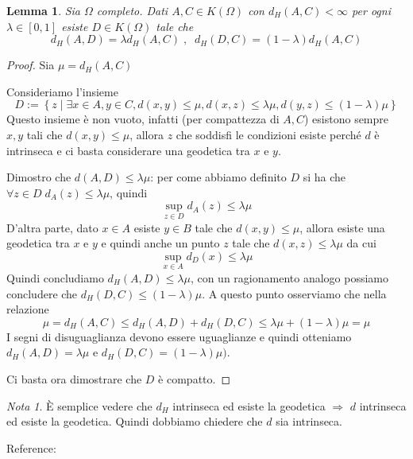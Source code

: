 \documentclass[a4paper,10pt]{article}
\newcounter{counter1}
\theoremstyle{plain}
\newtheorem{mylem}[counter1]{Lemma}
\theoremstyle{definition}
\theoremstyle{remark}
\newtheorem{mynot}[counter1]{Nota}
\newcommand{\set}[1]{\left\{#1\right\}}
\newcommand{\bra}[1]{\left[#1\right]}
\begin{document}
\begin{mylem}\cite[Proposizione 2.16]{DuciMennucci2007}
  Sia $\Omega$ completo. Dati $A,C \in K(\Omega)$ con $d_H(A,C) <
  \infty$ per ogni $\lambda \in \bra{0,1}$ esiste $D\in K(\Omega)$
  tale che
  \[ d_H(A,D) = \lambda d_H(A,C) \; , \;\;  d_H(D,C) = (1-\lambda)
  d_H(A,C) \] 
\end{mylem}
\begin{proof}
  Sia $\mu = d_H(A,C)$

  Consideriamo l'insieme
  \[ D := \set{z\mid \exists x \in A, y\in C, d(x,y) \le \mu, d(x,z)
    \le \lambda \mu, d(y,z) \le (1 - \lambda) \mu }\]
  Questo insieme è non vuoto, infatti (per compattezza di $A,C$)
  esistono sempre $x,y$ tali che $d(x,y) \le \mu$, allora $z$ che
  soddisfi le condizioni esiste perché $d$ è intrinseca e ci basta
  considerare una geodetica tra $x$ e $y$.

  Dimostro che $d(A,D) \le \lambda \mu$: per come abbiamo definito $D$
  si ha che $\forall z \in D\; d_A(z) \le \lambda \mu$, quindi
  \[ \sup _{z\in D} d_A(z) \le \lambda \mu \] D'altra parte, dato
  $x\in A$ esiste $y\in B$ tale che $d(x,y) \le \mu$, allora esiste
  una geodetica tra $x$ e $y$ e quindi anche un punto $z$ tale che
  $d(x,z) \le \lambda \mu$ da cui
  \[ \sup _{x \in A} d_D(x) \le \lambda \mu \]
  Quindi concludiamo $d_H(A,D) \le \lambda \mu$, con un ragionamento
  analogo possiamo concludere che $d_H(D,C) \le (1 - \lambda) \mu$.
  A questo punto osserviamo che nella relazione
  \[ \mu = d_H(A,C) \le d_H(A,D) + d_H(D,C) \le \lambda \mu + (1 -
  \lambda) \mu = \mu \]
  I segni di disuguaglianza devono essere uguaglianze e quindi
  otteniamo $d_H(A,D) = \lambda \mu$ e $d_H(D,C) = (1 - \lambda)
  \mu)$.

  Ci basta ora dimostrare che $D$ è compatto.
\end{proof}

\begin{mynot}
  È semplice vedere che $d_H$ intrinseca ed esiste la geodetica
  $\Rightarrow$ $d$ intrinseca ed esiste la geodetica. Quindi dobbiamo
  chiedere che $d$ sia intrinseca.
\end{mynot}


Reference: \cite[p.12-14]{DuciMennucci2007}


\newpage





\newpage
\end{document}
